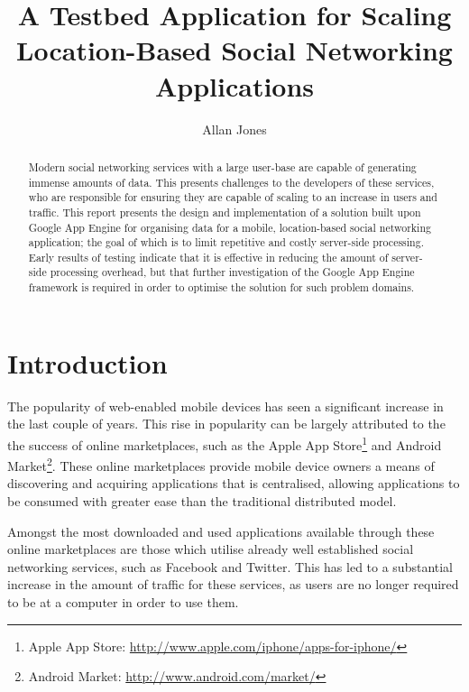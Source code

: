 \documentclass{article}
\title{A Testbed Application for Scaling Location-Based Social Networking Applications}
\author{Allan Jones}
\begin{document}
	\maketitle

\begin{abstract}
	Modern social networking services with a large user-base are capable of generating immense amounts of data. This presents challenges to the developers of these services, who are responsible for ensuring they are capable of scaling to an increase in users and traffic. This report presents the design and implementation of a solution built upon Google App Engine for organising data for a mobile, location-based social networking application; the goal of which is to limit repetitive and costly server-side processing. Early results of testing indicate that it is effective in reducing the amount of server-side processing overhead, but that further investigation of the Google App Engine framework is required in order to optimise the solution for such problem domains.
\end{abstract}

\section{Introduction} %
\label{sec:introduction}


The popularity of web-enabled mobile devices has seen a significant increase in the last couple of years. This rise in popularity can be largely attributed to the the success of online marketplaces, such as the Apple App Store\footnote{Apple App Store: \url{http://www.apple.com/iphone/apps-for-iphone/}} and Android Market\footnote{Android Market: \url{http://www.android.com/market/}}. These online marketplaces provide mobile device owners a means of discovering and acquiring applications that is centralised, allowing applications to be consumed with greater ease than the traditional distributed model.

Amongst the most downloaded and used applications available through these online marketplaces are those which utilise already well established social networking services, such as Facebook and Twitter. This has led to a substantial increase in the amount of traffic for these services, as users are no longer required to be at a computer in order to use them.
\end{document}
